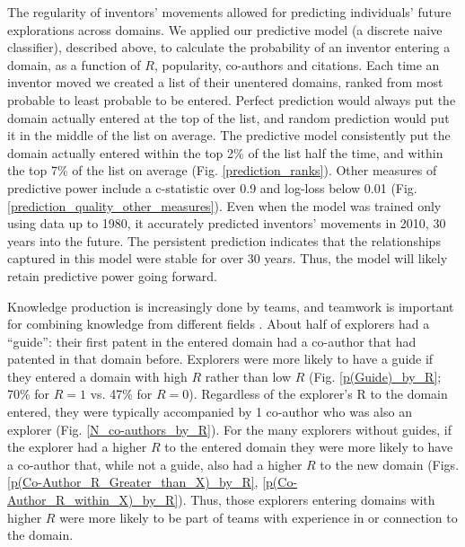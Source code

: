\documentclass{dsj}
\begin{document}
The regularity of inventors' movements allowed for predicting individuals' future explorations across domains. We applied our predictive model (a discrete naive classifier), described above, to calculate the probability of an inventor entering a domain, as a function of $R$, popularity, co-authors and citations. Each time an inventor moved we created a list of their unentered domains, ranked from most probable to least probable to be entered. Perfect prediction would always put the domain actually entered at the top of the list, and random prediction would put it in the middle of the list on average. The predictive model consistently put the domain actually entered within the top 2\% of the list half the time, and within the top 7\% of the list on average (Fig. \ref{prediction_ranks}). Other measures of predictive power include a c-statistic over 0.9 and log-loss below 0.01 (Fig. \ref{prediction_quality_other_measures}). Even when the model was trained only using data up to 1980, it accurately predicted inventors' movements in 2010, 30 years into the future. The persistent prediction indicates that the relationships captured in this model were stable for over 30 years. Thus, the model will likely retain predictive power going forward.

Knowledge production is increasingly done by teams, and teamwork is important for combining knowledge from different fields \cite{Wuchty2007,Uzzi2013}. About half of explorers had a ``guide'': their first patent in the entered domain had a co-author that had patented in that domain before. Explorers were more likely to have a guide if they entered a domain with high $R$ rather than low $R$ (Fig. \ref{p(Guide)_by_R}; 70\% for $R=1$ vs. 47\% for $R=0$). Regardless of the explorer’s R to the domain entered, they were typically accompanied by 1 co-author who was also an explorer (Fig. \ref{N_co-authors_by_R}). For the many explorers without guides, if the explorer had a higher $R$ to the entered domain they were more likely to have a co-author that, while not a guide, also had a higher $R$ to the new domain (Figs. \ref{p(Co-Author_R_Greater_than_X)_by_R}, \ref{p(Co-Author_R_within_X)_by_R}). Thus, those explorers entering domains with higher $R$ were more likely to be part of teams with experience in or connection to the domain.
\end{document}
